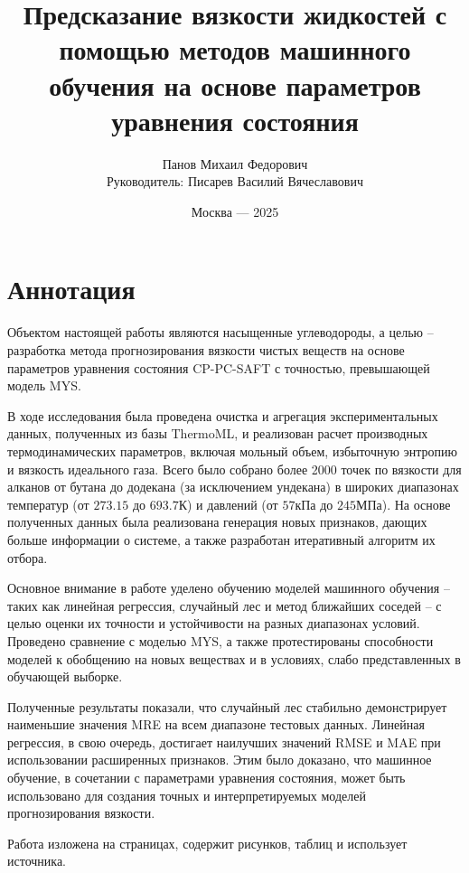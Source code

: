 \documentclass[a4paper,12pt]{article}
\title{\Huge{Предсказание вязкости жидкостей с помощью методов машинного обучения на основе параметров уравнения состояния}}
\author{Панов Михаил Федорович \\ Руководитель: Писарев Василий Вячеславович}
\date{Москва --- 2025}
\begin{document}


\section*{Аннотация}
  Объектом настоящей работы являются насыщенные углеводороды, а целью -- разработка метода прогнозирования вязкости чистых веществ на основе параметров уравнения состояния CP-PC-SAFT с точностью, превышающей модель MYS. 
  
  В ходе исследования была проведена очистка и агрегация экспериментальных данных, полученных из базы ThermoML, и реализован расчет производных термодинамических параметров, включая мольный объем, избыточную энтропию и вязкость идеального газа. 
  Всего было собрано более 2000 точек по вязкости для алканов от бутана до додекана (за исключением ундекана) в широких диапазонах температур (от $273.15$ до $693.7$К) и давлений (от $57$кПа до $245$МПа).
  На основе полученных данных была реализована генерация новых признаков, дающих больше информации о системе, а также разработан итеративный алгоритм их отбора.
  
  Основное внимание в работе уделено обучению моделей машинного обучения -- таких как линейная регрессия, случайный лес и метод ближайших соседей -- с целью оценки их точности и устойчивости на разных диапазонах условий. Проведено сравнение с моделью MYS, а также протестированы способности моделей к обобщению на новых веществах и в условиях, слабо представленных в обучающей выборке.
  
  Полученные результаты показали, что случайный лес стабильно демонстрирует наименьшие значения MRE на всем диапазоне тестовых данных. Линейная регрессия, в свою очередь, достигает наилучших значений RMSE и MAE при использовании расширенных признаков. Этим было доказано, что машинное обучение, в сочетании с параметрами уравнения состояния, может быть использовано для создания точных и интерпретируемых моделей прогнозирования вязкости.
  
  Работа изложена на \pageref{LastPage} страницах, содержит  рисунков,  таблиц и использует  источника.
\end{document}

